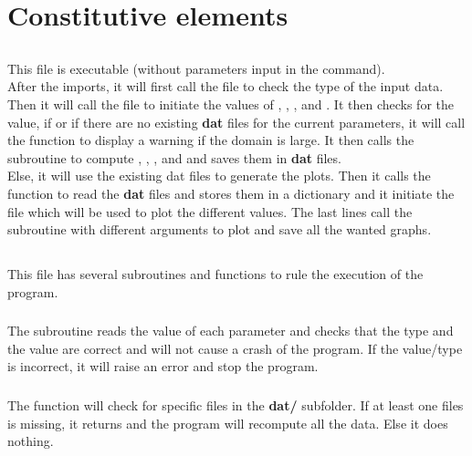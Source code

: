 \section{Constitutive elements}
\subsection{}
This file is executable (without parameters input in the command).\\
After the imports, it will first call the file  to check the
type of the input data.\\
Then it will call the file  to initiate
the values of , , ,  and .
\smallbreak{}
It then checks for the  value, if  or if there are no
existing \textbf{dat} files for the current parameters, it will call
the function  to display a warning if the domain is large.
It then calls the subroutine  to compute ,
, ,  and  and saves them in
\textbf{dat} files.\\
Else, it will use the existing dat files to generate the plots.
\smallbreak{}
Then it calls the function  to read the \textbf{dat} files and
stores them in a dictionary and it initiate the file  which will be
used to plot the different values.
\smallbreak{}
The last lines call the subroutine  with different arguments
to plot and save all the wanted graphs.

\subsection{}
This file has several subroutines and functions to rule the execution of the
program.

\subsubsection{\textcolor{func}{}}
The subroutine \textcolor{func}{} reads the value of each
parameter and checks that the type and the value are correct and will not cause
a crash of the program. If the value/type is incorrect, it will raise an error
and stop the program.

\subsubsection{\textcolor{func}{}}
The function \textcolor{func}{} will check for specific
files in the \textbf{dat/} subfolder. If at least one files is missing, it
returns  and the program will recompute all the data. Else it does
nothing.

